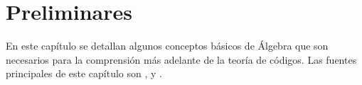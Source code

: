 \chapter{Preliminares}

En este capítulo se detallan algunos conceptos básicos de Álgebra que son necesarios para la comprensión más adelante de la teoría de códigos.
Las fuentes principales de este capítulo son \parencite[cap. 3 y 6]{cohn_algebra_1982}, \parencite[cap. 3]{cohn_algebra_1989} y \parencite[cap. 2]{lidl_introduction_1986}.






